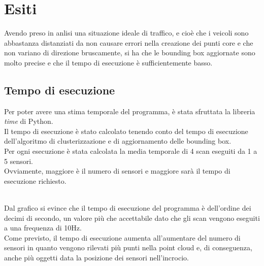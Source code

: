\documentclass[italian]{report}
\begin{document}
\newpage
\chapter{Esiti}
Avendo preso in anlisi una situazione ideale di traffico, e cioè che i veicoli sono abbastanza distanziati da non causare errori nella creazione dei punti core e che non variano di direzione bruscamente, si ha che le bounding box aggiornate sono molto precise e che il tempo di esecuzione è sufficientemente basso.\\
\section{Tempo di esecuzione}
Per poter avere una stima temporale del programma, è stata sfruttata la libreria \textit{time} di Python.\\
Il tempo di esecuzione è stato calcolato tenendo conto del tempo di esecuzione dell'algoritmo di clusterizzazione e di aggiornamento delle bounding box.\\
Per ogni esecuzione è stata calcolata la media temporale di 4 scan eseguiti da 1 a 5 sensori.\\
Ovviamente, maggiore è il numero di sensori e maggiore sarà il tempo di esecuzione richiesto.\\
\\
Dal grafico si evince che il tempo di esecuzione del programma è dell'ordine dei decimi di secondo, un valore più che accettabile dato che gli scan vengono eseguiti a una frequenza di 10Hz.\\
Come previsto, il tempo di esecuzione aumenta all'aumentare del numero di sensori in quanto vengono rilevati più punti nella point cloud e, di conseguenza, anche più oggetti data la posizione dei sensori nell'incrocio.\\
\end{document}

